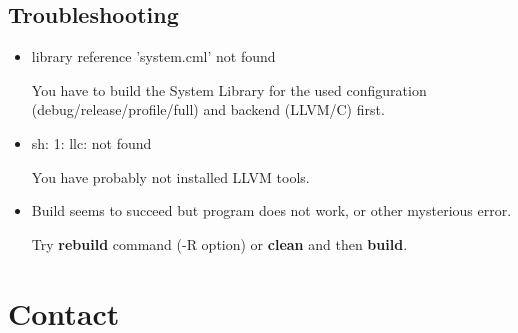 \documentclass[oneside, a4paper, 11pt]{article}
\begin{document}
\subsection{Troubleshooting}

\begin{itemize}

\item
library reference 'system.cml' not found

You have to build the System Library for the used configuration (debug/release/profile/full) and backend (LLVM/C) first.

\item
sh: 1: llc: not found

You have probably not installed LLVM tools.

\item
Build seems to succeed but program does not work, or other mysterious error.

Try \textbf{rebuild} command (-R option) or \textbf{clean} and then \textbf{build}.

\end{itemize}

\section{Contact}

\end{document}
